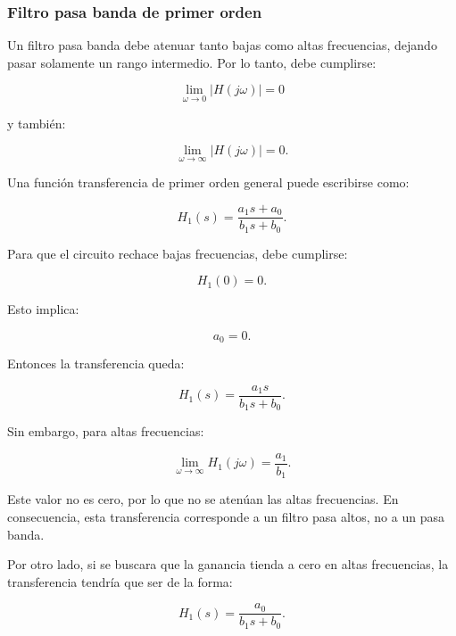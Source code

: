 \subsubsection{Filtro pasa banda de primer orden}

Un filtro pasa banda debe atenuar tanto bajas como altas frecuencias, dejando pasar solamente un rango intermedio. Por lo tanto, debe cumplirse:

\begin{equation}
    \lim_{\omega\to0}|H(j\omega)|=0
\end{equation}

y también:

\begin{equation}
    \lim_{\omega\to\infty}|H(j\omega)|=0.
\end{equation}

Una función transferencia de primer orden general puede escribirse como:

\begin{equation}
    H_1(s)=\frac{a_1s+a_0}{b_1s+b_0}.
\end{equation}

Para que el circuito rechace bajas frecuencias, debe cumplirse:

\begin{equation}
    H_1(0)=0.
\end{equation}

Esto implica:

\begin{equation}
    a_0=0.
\end{equation}

Entonces la transferencia queda:

\begin{equation}
    H_1(s)=\frac{a_1s}{b_1s+b_0}.
\end{equation}

Sin embargo, para altas frecuencias:

\begin{equation}
    \lim_{\omega\to\infty}H_1(j\omega)=\frac{a_1}{b_1}.
\end{equation}

Este valor no es cero, por lo que no se atenúan las altas frecuencias. En consecuencia, esta transferencia corresponde a un filtro pasa altos, no a un pasa banda.

Por otro lado, si se buscara que la ganancia tienda a cero en altas frecuencias, la transferencia tendría que ser de la forma:

\begin{equation}
    H_1(s)=\frac{a_0}{b_1s+b_0}.
\end{equation}

